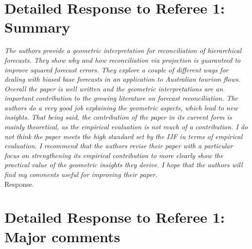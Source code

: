 \documentclass[a4paper,11pt]{article}
\begin{document}
	
	
	\section*{Detailed Response to Referee 1: Summary}
	
	\textit{The authors provide a geometric interpretation for reconciliation of hierarchical forecasts. They show why and how reconciliation via projection is guaranteed to improve squared forecast errors. They explore a couple of different ways for dealing with biased base forecasts in an application to Australian tourism flows. Overall the paper is well written and the geometric interpretations are an important contribution to the growing literature on forecast reconciliation. The	authors do a very good job explaining the geometric aspects, which lead to new insights. That being said, the contribution of the paper in its current form is mainly theoretical, as the empirical evaluation is not much of a contribution.  I do not think the paper meets the high standard set by the IJF in terms of empirical evaluation. I recommend that the authors revise their paper with a particular focus on strengthening its empirical contribution to more clearly	show the practical value of the geometric insights they derive. I hope that the authors will find my comments useful for improving their paper.}\\	
	Response.\\
	
	\section*{Detailed Response to Referee 1: Major comments}
	
\end{document}

